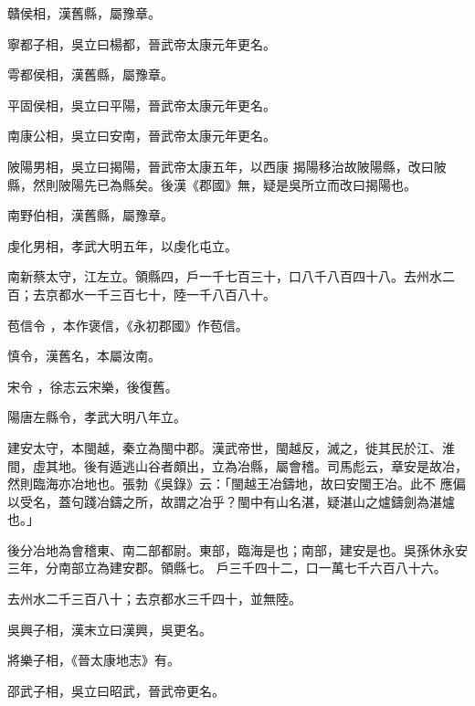 \begin{pinyinscope}
 贛侯相，漢舊縣，屬豫章。



 寧都子相，吳立曰楊都，晉武帝太康元年更名。



 雩都侯相，漢舊縣，屬豫章。



 平固侯相，吳立曰平陽，晉武帝太康元年更名。



 南康公相，吳立曰安南，晉武帝太康元年更名。



 陂陽男相，吳立曰揭陽，晉武帝太康五年，以西康
 揭陽移治故陂陽縣，改曰陂縣，然則陂陽先已為縣矣。後漢《郡國》無，疑是吳所立而改曰揭陽也。



 南野伯相，漢舊縣，屬豫章。



 虔化男相，孝武大明五年，以虔化屯立。



 南新蔡太守，江左立。領縣四，戶一千七百三十，口八千八百四十八。去州水二百；去京都水一千三百七十，陸一千八百八十。


苞信令
 ，本作褒信，《永初郡國》作苞信。



 慎令，漢舊名，本屬汝南。


宋令
 ，徐志云宋樂，後復舊。



 陽唐左縣令，孝武大明八年立。



 建安太守，本閩越，秦立為閩中郡。漢武帝世，閩越反，滅之，徙其民於江、淮間，虛其地。後有遁逃山谷者頗出，立為冶縣，屬會稽。司馬彪云，章安是故冶，然則臨海亦冶地也。張勃《吳錄》云：「閩越王冶鑄地，故曰安閩王冶。此不
 應偏以受名，蓋句踐冶鑄之所，故謂之冶乎？閩中有山名湛，疑湛山之爐鑄劍為湛爐也。」


後分冶地為會稽東、南二部都尉。東部，臨海是也；南部，建安是也。吳孫休永安三年，分南部立為建安郡。領縣七。
 戶三千四十二，口一萬七千六百八十六。



 去州水二千三百八十；去京都水三千四十，並無陸。



 吳興子相，漢末立曰漢興，吳更名。



 將樂子相，《晉太康地志》有。



 邵武子相，吳立曰昭武，晉武帝更名。




\end{pinyinscope}
